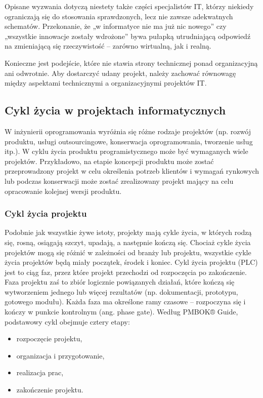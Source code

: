 Opisane wyzwania dotyczą niestety także części specjalistów IT, którzy niekiedy ograniczają się do stosowania sprawdzonych, lecz nie zawsze adekwatnych schematów. Przekonanie, że „w informatyce nie ma już nic nowego” czy „wszystkie innowacje zostały wdrożone” bywa pułapką utrudniającą odpowiedź na zmieniającą się rzeczywistość – zarówno wirtualną, jak i realną.\autocite{ITPMChmielarz}

Konieczne jest podejście, które nie stawia strony technicznej ponad organizacyjną ani odwrotnie. Aby dostarczyć udany projekt, należy zachować równowagę między aspektami technicznymi a organizacyjnymi projektów IT. \autocite{ITPMMarchewka}

\subsection{Cykl życia w projektach informatycznych}
W inżynierii oprogramowania wyróżnia się różne rodzaje projektów (np. rozwój produktu, usługi outsourcingowe, konserwacja oprogramowania, tworzenie usług itp.).
W cyklu życia produktu programistycznego może być wymaganych wiele projektów. Przykładowo, na etapie koncepcji produktu może zostać przeprowadzony projekt w celu określenia potrzeb klientów i wymagań rynkowych lub podczas konserwacji może zostać zrealizowany projekt mający na celu opracowanie kolejnej wersji produktu.\autocite{swebok}

\subsubsection{Cykl życia projektu}
Podobnie jak wszystkie żywe istoty, projekty mają cykle życia, w których rodzą się, rosną, osiągają szczyt,
upadają, a następnie kończą się\autocite{gido}.
Chociaż cykle życia projektów mogą się różnić w zależności od branży lub projektu, wszystkie cykle życia projektów będą miały początek, środek i koniec\autocite{Rosenau}.
Cykl życia projektu (PLC) jest to ciąg faz, przez które projekt przechodzi od rozpoczęcia po zakończenie. \autocite{pmbok7} Faza projektu zaś to zbiór logicznie powiązanych działań, które kończą się wytworzeniem jednego lub więcej rezultatów (np. dokumentacji, prototypu, gotowego modułu).
Każda faza ma określone ramy czasowe – rozpoczyna się i kończy w punkcie kontrolnym (ang. phase gate). Według PMBOK® Guide, podstawowy cykl obejmuje cztery etapy:
\begin{itemize}
    \item rozpoczęcie projektu,
    \item organizacja i przygotowanie,
    \item realizacja prac,
    \item zakończenie projektu.
\end{itemize}

